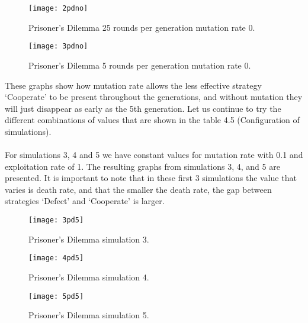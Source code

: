 \documentclass{book}
\begin{document}
\begin{figure}[H]
\begin{center}
	\texttt{[image: 2pdno]}

\caption{ Prisoner's Dilemma 25 rounds per generation mutation rate 0.}
\label{fig:pds2mr0}		
\end{center}
\end{figure}

\begin{figure}[H]
\begin{center}
	\texttt{[image: 3pdno]}

\caption{ Prisoner's Dilemma 5 rounds per generation mutation rate 0.}
\label{fig:pds3mr0}	
\end{center}
\end{figure}


These graphs show how mutation rate allows the less effective strategy `Cooperate' to be present throughout the generations, and without mutation they will just disappear as early as the 5th generation. 
Let us continue to try the different combinations of values that are shown in the table 4.5 (Configuration of simulations). 
\\\\For simulations 3, 4 and 5 we have constant values for mutation rate with 0.1 and exploitation rate of 1. The resulting graphs from simulations 3, 4, and 5 are presented. It is important to note that in these first 3 simulations the value that varies is death rate, and that the smaller the death rate, the gap between strategies `Defect' and `Cooperate' is larger.

\begin{figure}[H]
\begin{center}
	\texttt{[image: 3pd5]}
	
\caption{Prisoner's Dilemma simulation 3.}
\label{fig:pds3}	
\end{center}
\end{figure}

\begin{figure}[H]
\begin{center}
	\texttt{[image: 4pd5]}
	
\caption{Prisoner's Dilemma simulation 4.}
\label{fig:pds4}	
\end{center}
\end{figure}

\begin{figure}[H]
\begin{center}
	\texttt{[image: 5pd5]}

\caption{ Prisoner's Dilemma simulation 5.}
\label{fig:pds5}	
\end{center}
\end{figure}
\end{document}
